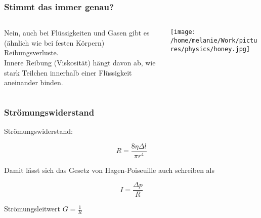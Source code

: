 \documentclass{beamer}
\begin{document}
\begin{frame}
\frametitle{Stimmt das immer genau?}

\pause
\begin{columns}[c]
\begin{column}{5cm}

Nein, auch bei Flüssigkeiten und Gasen gibt es (ähnlich wie bei festen Körpern) Reibungsverluste. \\

Innere Reibung (Viskosität) hängt davon ab, wie stark Teilchen innerhalb einer Flüssigkeit aneinander binden. 

\end{column}

\begin{column}{5cm}
\begin{center}
\texttt{[image: /home/melanie/Work/pictures/physics/honey.jpg]}
\end{center}
\end{column}

\end{columns}

\end{frame}



\begin{frame}
\end{frame}


\begin{frame}
\frametitle{Strömungswiderstand}

Strömungswiderstand: 

\[
R = \frac{8 \eta \Delta l}{\pi r^4}
\]

\pause

Damit lässt sich das Gesetz von Hagen-Poiseuille auch schreiben als

\[
I = \frac{\Delta p}{R}
\]

\pause

Strömungsleitwert \(G = \frac{1}{R}\)


\end{frame}
\end{document}
